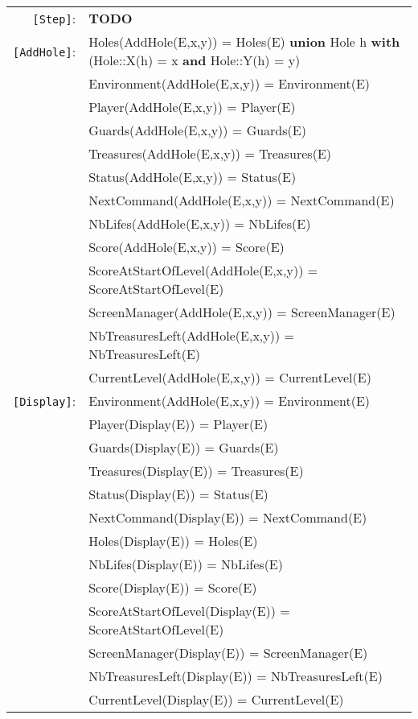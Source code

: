\documentclass[7pt]{article}
\begin{document}
\begin{tabular}{rl}
       \texttt{[Step]}: & \textbf{TODO\
} \\
    \texttt{[AddHole]}: & Holes(AddHole(E,x,y)) = Holes(E) \textbf{union} Hole h \textbf{ with} (Hole::X(h) = x \textbf{and} Hole::Y(h) = y) \\
       & Environment(AddHole(E,x,y)) = Environment(E) \\
       & Player(AddHole(E,x,y)) = Player(E) \\
       & Guards(AddHole(E,x,y)) = Guards(E) \\
       & Treasures(AddHole(E,x,y)) = Treasures(E) \\
       & Status(AddHole(E,x,y)) = Status(E) \\
       & NextCommand(AddHole(E,x,y)) = NextCommand(E) \\
       & NbLifes(AddHole(E,x,y)) = NbLifes(E) \\
       & Score(AddHole(E,x,y)) = Score(E) \\
       & ScoreAtStartOfLevel(AddHole(E,x,y)) = ScoreAtStartOfLevel(E) \\
       & ScreenManager(AddHole(E,x,y)) = ScreenManager(E) \\
       & NbTreasuresLeft(AddHole(E,x,y)) = NbTreasuresLeft(E) \\
       & CurrentLevel(AddHole(E,x,y)) = CurrentLevel(E) \\
       
       \texttt{[Display]}: & Environment(AddHole(E,x,y)) = Environment(E) \\
       & Player(Display(E)) = Player(E) \\
       & Guards(Display(E)) = Guards(E) \\
       & Treasures(Display(E)) = Treasures(E) \\
       & Status(Display(E)) = Status(E) \\
       & NextCommand(Display(E)) = NextCommand(E) \\
       & Holes(Display(E)) = Holes(E) \\
       & NbLifes(Display(E)) = NbLifes(E) \\
       & Score(Display(E)) = Score(E) \\
       & ScoreAtStartOfLevel(Display(E)) = ScoreAtStartOfLevel(E) \\
       & ScreenManager(Display(E)) = ScreenManager(E) \\
       & NbTreasuresLeft(Display(E)) = NbTreasuresLeft(E) \\
       & CurrentLevel(Display(E)) = CurrentLevel(E) \\

\end{tabular}
\newpage
\end{document}
